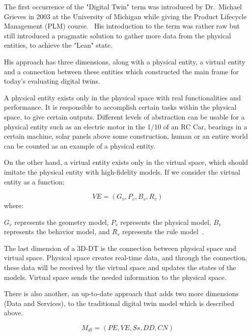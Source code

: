 \documentclass[9pt,conference]{IEEEtran}
\begin{document}
    The first occurrence of the "Digital Twin" term was introduced by Dr.~Michael Grieves in 2003 at the University of Michigan while giving the Product Lifecycle Management (PLM) course.~\cite{DTGRIEVES}
    His introduction to the term was rather raw but still introduced a pragmatic solution to gather more data from the physical entities, to achieve the "Lean" state.
    
    His approach has three dimensions, along with a physical entity, a virtual entity and a connection between these entities which constructed the main frame for today's evaluating digital twins.~\cite{DTGRIEVES}

    A physical entity exists only in the physical space with real functionalities and performance. It is responsible to accomplish certain tasks within the physical space, to give certain outputs.
    Different levels of abstraction can be usable for a physical entity such as an electric motor in the 1/10 of an RC Car, bearings in a certain machine, solar panels above some construction, human or an entire world can be counted as an example of a physical entity.

    On the other hand, a virtual entity exists only in the virtual space, which should imitate the physical entity with high-fidelity models. If we consider the virtual entity as a function;

    \begin{equation}\label{Formulated Entity Equation}
        VE = (G_v, P_v, B_v, R_v)
    \end{equation}
    where:
    
    $G_v$ represents the geometry model, $P_v$ represents the physical model, $B_v$ represents  the behavior model, and $R_v$ represents the rule model~\cite{DTGRIEVES}.
    
    The last dimension of a 3D-DT is the connection between physical space and virtual space. Physical space creates real-time data, and through the connection, these data will be received by the virtual space 
    and updates the states of the models. Virtual space sends the needed information to the physical space.  

    There is also another, an up-to-date approach that adds two more dimensions (Data and Services), to the traditional digital twin model which is described above.~\cite{DTGRIEVES}

    \begin{equation}
        M_{dt} = (PE,VE,Ss,DD,CN)
    \end{equation}
\end{document}
